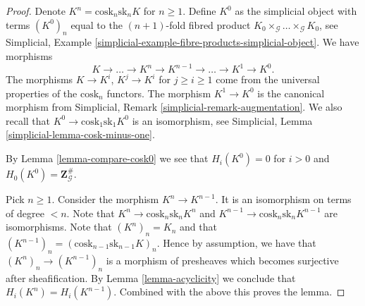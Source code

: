 \documentclass[10pt,a4paper]{amsart}
\theoremstyle{plain}
\theoremstyle{definition}
\theoremstyle{remark}
\numberwithin{equation}{subsection}
\begin{document}
\begin{proof}
Denote $K^n = \text{cosk}_n \text{sk}_n K$ for $n \geq 1$.
Define $K^0$ as the simplicial object with terms
$(K^0)_n$ equal to the $(n + 1)$-fold fibred product
$K_0 \times_\mathcal{G} \ldots \times_\mathcal{G} K_0$,
see Simplicial,
Example \ref{simplicial-example-fibre-products-simplicial-object}.
We have morphisms
$$
K \longrightarrow \ldots \to K^n \to K^{n - 1} \to \ldots \to K^1 \to K^0.
$$
The morphisms $K \to K^i$, $K^j \to K^i$ for $j \geq i \geq 1$ come
from the universal properties of the $\text{cosk}_n$ functors.
The morphism $K^1 \to K^0$ is the canonical morphism
from
Simplicial, Remark \ref{simplicial-remark-augmentation}.
We also recall that $K^0 \to \text{cosk}_1 \text{sk}_1 K^0$
is an isomorphism, see
Simplicial, Lemma \ref{simplicial-lemma-cosk-minus-one}.

\medskip\noindent
By Lemma \ref{lemma-compare-cosk0} we see that
$H_i(K^0) = 0$ for $i > 0$ and $H_0(K^0) = \mathbf{Z}_\mathcal{G}^\#$.

\medskip\noindent
Pick $n \geq 1$. Consider the morphism $K^n \to K^{n - 1}$.
It is an isomorphism on terms of degree $< n$.
Note that $K^n \to \text{cosk}_n \text{sk}_n K^n$ and
$K^{n - 1} \to \text{cosk}_n \text{sk}_n K^{n - 1}$
are isomorphisms. Note that $(K^n)_n = K_n$ and
that $(K^{n - 1})_n = (\text{cosk}_{n - 1} \text{sk}_{n - 1} K)_n$.
Hence by assumption, we have that $(K^n)_n \to (K^{n - 1})_n$
is a morphism of presheaves which becomes surjective after
sheafification. By Lemma \ref{lemma-acyclicity} we conclude that
$H_i(K^n) = H_i(K^{n - 1})$.
Combined with the above this proves the lemma.
\end{proof}
\end{document}

